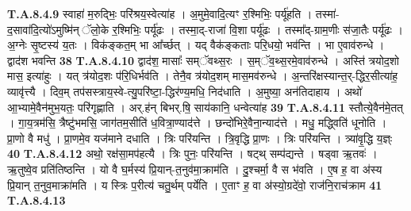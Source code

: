 \documentclass[17pt]{extarticle}
\begin{document}
                  \newline
                                                                  \textbf{ T.A.8.4.9} \newline
                  स्वाहा॑ म॒रुद्भिः॒ परि॑श्रय॒स्वेत्या॑ह । अ॒मुमे॒वादि॒त्यꣳ र॒श्मिभिः॒ पर्यू॑हति ।  तस्मा॑-द॒सावा॑दि॒त्यो॑ऽमुष्मि॑न् ॅलो॒के र॒श्मिभिः॒ पर्यू॑ढः । तस्मा॒द्-राजा॑ वि॒शा पर्यू॑ढः । तस्मा᳚द्-ग्राम॒णीः स॑जा॒तैः पर्यू॑ढः । अ॒ग्नेः सृ॒ष्टस्य॑ य॒तः । विक॑ङ्कत॒म् भा आ᳚र्च्छत् ।  यद् वैक॑ङ्कताः परि॒धयो॒ भव॑न्ति ।  भा ए॒वाव॑रुन्धे । द्वाद॑श भवन्ति \textbf{ 38} \newline
                  \newline
                                                                  \textbf{ T.A.8.4.10} \newline
                  द्वाद॑श॒ मासाः᳚ सम्ॅवथ्स॒रः । स॒म्ॅव॒थ्स॒रमे॒वाव॑रुन्धे ।  अस्ति॑ त्रयोद॒शो मास॒ इत्या॑हुः । यत् त्र॑योद॒शः प॑रि॒धिर्भव॑ति । तेनै॒व त्र॑योद॒शम् मास॒मव॑रुन्धे । अ॒न्तरि॑क्षस्यान्त॒र्-द्धिर॒सीत्या॑ह॒ व्यावृ॑त्त्यै । दिव॒म् तप॑सस्त्राय॒स्वे-त्यु॒परि॑ष्टा॒-द्धिर॑ण्य॒मधि॒ निद॑धाति । अ॒मुष्या॒ अन॑तिदाहाय । अथो॑ आ॒भ्यामे॒वैन॑मुभ॒यतः॒ परि॑गृह्णाति ।  अर्.ह॑न् बिभर्.षि॒ साय॑कानि॒ धन्वेत्या॑ह \textbf{ 39} \newline
                  \newline
                                                                  \textbf{ T.A.8.4.11} \newline
                  स्तौत्ये॒वैन॑मे॒तत् । गा॒य॒त्रम॑सि॒ त्रैष्टु॑भमसि॒ जाग॑तम॒सीति॑ ध॒वित्रा॒ण्याद॑त्ते । छन्दो॑भिरे॒वैना॒न्याद॑त्ते । मधु॒ मद्ध्विति॑ धूनोति । प्रा॒णो वै मधु॑ । प्रा॒णमे॒व यज॑माने दधाति । त्रिः परि॑यन्ति । त्रि॒वृद्धि प्रा॒णः ।  त्रिः परि॑यन्ति । त्र्या॑वृ॒द्धि य॒ज्ञ्ः \textbf{ 40} \newline
                  \newline
                                                                  \textbf{ T.A.8.4.12} \newline
                  अथो॒ रक्ष॑सा॒मप॑हत्यै । त्रिः पुनः॒ परि॑यन्ति ।  षट्थ् सम्प॑द्यन्ते । षड्वा ऋ॒तवः॑ । ऋ॒तुष्वे॒व प्रति॑तिष्ठन्ति । यो वै घ॒र्मस्य॑ प्रि॒यान्-त॒नुव॑मा॒क्राम॑ति । दु॒श्चर्मा॒ वै स भ॑वति ।  ए॒ष ह॒ वा अ॑स्य प्रि॒यान् त॒नुव॒माक्रा॑मति ।  य स्त्रिः प॒रीत्य॑ चतु॒र्थम् पर्ये॑ति ।  ए॒ताꣳ ह॒ वा अ॑स्यो॒ग्रदे॑वो॒ राज॑नि॒राच॑क्राम \textbf{ 41} \newline
                  \newline
                                                                  \textbf{ T.A.8.4.13} \newline
\end{document}
